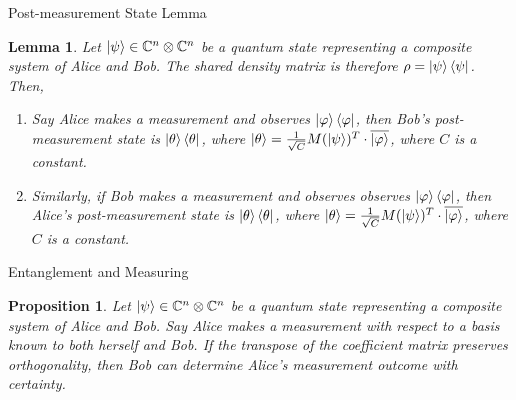 \documentclass[handout, 10 pt]{beamer}
\newtheorem{prop}{Proposition}
\newtheorem{lemm}{Lemma}
\begin{document}
\begin{frame}{Post-measurement State Lemma}
\begin{lemm}
\label{end state lemma}
Let $\ket{\psi} \in \mathbb{C}^n \otimes \mathbb{C}^{n}$ be a quantum state representing a composite system of Alice and Bob.  The shared density matrix is therefore $\rho = \ket{\psi}\bra{\psi}$. Then,
\begin{enumerate}
\item Say Alice makes a measurement and observes $\ket{\varphi}\bra{\varphi}$, then Bob's post-measurement state is $\ket{\theta}\bra{\theta}$, where $\ket{\theta}=\frac{1}{\sqrt{C}}M(\ket{\psi})^T \cdot \overline{\ket{\varphi}}$, where $C$ is a constant.
\item Similarly, if Bob makes a measurement and observes observes $\ket{\varphi}\bra{\varphi}$, then Alice's post-measurement state is $\ket{\theta}\bra{\theta}$, where $\ket{\theta}=\frac{1}{\sqrt{C}}M(\ket{\psi})^T\cdot \overline{\ket{\varphi}}$, where $C$ is a constant.\\

\end{enumerate}
\end{lemm}
\end{frame}
\begin{frame}{Entanglement and Measuring}
    \begin{prop}
Let $\ket{\psi} \in \mathbb{C}^n \otimes \mathbb{C}^{n}$ be a quantum state representing a composite system of Alice and Bob. Say Alice makes a measurement with respect to a basis known to both herself and Bob.  If the transpose of the coefficient matrix preserves orthogonality, then Bob can determine Alice's measurement outcome with certainty. 
\end{prop}
\end{frame}





\end{document}
